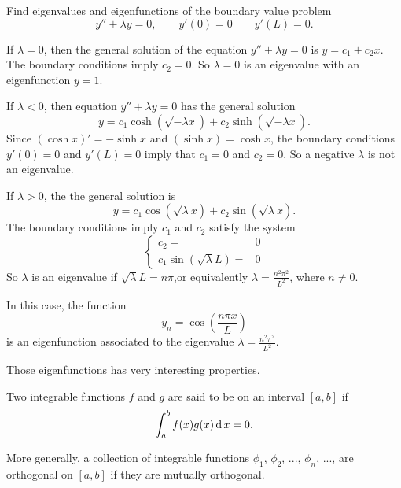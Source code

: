 \begin{exercise}
  Find eigenvalues and eigenfunctions of the boundary value problem
  \[
  y''+\lambda y=0, \qquad y'(0)=0 \qquad y'(L)=0.
\]
\end{exercise}
\begin{exersol}
  If $\lambda =0$, then the general solution of the equation $y''+\lambda y=0$ is
  $y=c_1+c_2x$. The boundary conditions imply $c_2=0$. So $\lambda=0$ is an eigenvalue with an eigenfunction $y=1$.
  
  If $\lambda<0$, then equation $y''+\lambda y=0$ has the general solution
  \[y=c_1\cosh(\sqrt{-\lambda x})+c_2\sinh(\sqrt{-\lambda x}).\]
  Since $(\cosh x)'=-\sinh x$ and $(\sinh x)=\cosh x$,  the boundary conditions $y'(0)=0$ and $y'(L)=0$ imply that $c_1=0$ and $c_2=0$.
  So a negative $\lambda$ is not an eigenvalue.

  If $\lambda>0$, the the general solution is 
  \[y=c_1\cos(\sqrt{\lambda} x)+c_2\sin(\sqrt{\lambda} x).\]
  The boundary conditions imply $c_1$ and $c_2$ satisfy the system
  \[
    \begin{cases}
      c_2=&0  \\
      c_1\sin(\sqrt{\lambda} L)=&0
    \end{cases}
  \]
  So $\lambda$ is an eigenvalue if $\sqrt{\lambda} L=n\pi$,or equivalently $\lambda=\frac{n^2\pi^2}{L^2}$, where  $n\neq 0$.

  In this case, the function
  \[y_n=\cos\left(\frac{n\pi x}{L}\right)\]
  is an eigenfunction associated to the eigenvalue $\lambda=\frac{n^2\pi^2}{L^2}$.
\end{exersol}

Those eigenfunctions has very interesting properties.

Two integrable functions $f$ and $g$ are said to be  on an interval $[a,b]$ if
\[\int_a^bf(x)g(x)\operatorname{d} x=0.\]

More generally, a collection of integrable functions $\phi_1$, $\phi_2$, ..., $\phi_n$, ..., are orthogonal on $[a,b]$ if they are mutually orthogonal.

